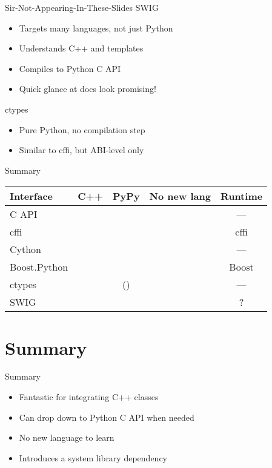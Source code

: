 \documentclass{beamer}
\begin{document}
\begin{frame}{Sir-Not-Appearing-In-These-Slides}
  SWIG
  \begin{itemize}
    \item Targets many languages, not just Python
    \item Understands C++ and templates
    \item Compiles to Python C API
    \item Quick glance at docs look promising!
  \end{itemize}
  ctypes
  \begin{itemize}
    \item Pure Python, no compilation step
    \item Similar to cffi, but ABI-level only
  \end{itemize}
\end{frame}

\begin{frame}{Summary}
  \def\yes{\textcolor{green!50!black}{\CheckmarkBold}}
  \def\no{\textcolor{red}{\XSolidBrush}}
  \begin{table}
    \begin{tabular}{lcccc}
      \toprule
      Interface & C++ & PyPy & No new lang & Runtime\\
      \midrule
      C API & \no & \no & \yes & ---\\
      cffi  & \no & \yes & \yes & cffi\\
      Cython & \yes & \no & \no & ---\\
      Boost.Python & \yes & \no & \yes & Boost\\
      ctypes & \no & (\yes) & \yes & ---\\
      SWIG & \yes & \no & \no & ?\\
      \bottomrule
    \end{tabular}
  \end{table}
\end{frame}


\section*{Summary}

\begin{frame}{Summary}
  \begin{itemize}
    \item Fantastic for integrating C++ classes
    \item Can drop down to Python C API when needed
    \item No new language to learn
    \item Introduces a system library dependency
  \end{itemize}
\end{frame}
\end{document}

